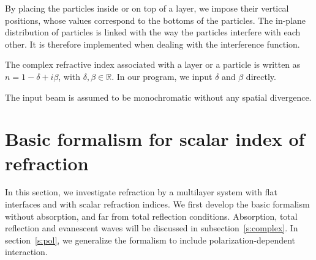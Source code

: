 By placing the particles
inside or on top of a layer, we impose their vertical positions, whose
values correspond to the bottoms of the particles. The in-plane distribution of particles is linked with the way the
particles interfere with each other. It is therefore implemented
when dealing with the interference function.


The complex refractive index associated with a layer or a particle
is written as $n=1-\delta +i\beta$,
with $\delta, \beta \in \mathbb{R}$.
In our program, we input $\delta$ and $\beta$ directly.


\noindent The input beam is assumed to be monochromatic without any
spatial divergence.\\ %

\renewcommand{\u}[1]{\underline{#1}}
\newcommand{\uu}[1]{\underline{\underline{#1}}}
\renewcommand{\t}{\uparrow}
\renewcommand{\d}{\downarrow}



\section{Basic formalism for scalar index of refraction}

In this section,
we investigate refraction by a multilayer system
with flat interfaces and with scalar refraction indices.
We first develop the basic formalism
without absorption, and far from total reflection conditions.
Absorption, total reflection and evanescent waves
will be discussed in subsection~\ref{s:complex}.
In section~\ref{s:pol},
we generalize the formalism to include
polarization-dependent interaction.

